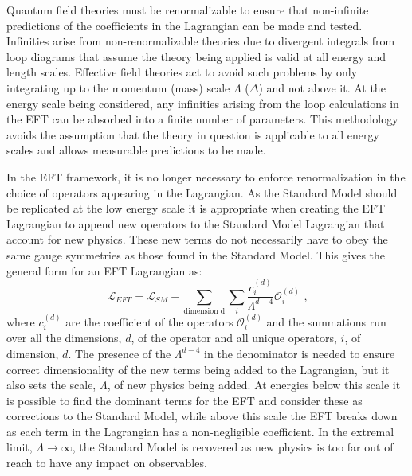 Quantum field theories must be renormalizable to ensure that non-infinite predictions of the coefficients in the Lagrangian can be made and tested.  Infinities arise from non-renormalizable theories due to divergent integrals from loop diagrams that assume the theory being applied is valid at all energy and length scales.  Effective field theories act to avoid such problems by only integrating up to the momentum (mass) scale $\Lambda$ ($\Delta$) and not above it.  At the energy scale being considered, any infinities arising from the loop calculations in the EFT can be absorbed into a finite number of parameters.  This methodology avoids the assumption that the theory in question is applicable to all energy scales and allows measurable predictions to be made.  

In the EFT framework, it is no longer necessary to enforce renormalization in the choice of operators appearing in the Lagrangian.  As the Standard Model should be replicated at the low energy scale it is appropriate when creating the EFT Lagrangian to append new operators to the Standard Model Lagrangian that account for new physics.  These new terms do not necessarily have to obey the same gauge symmetries as those found in the Standard Model.  This gives the general form for an EFT Lagrangian as:
%
\begin{equation}
\mathcal{L}_{EFT} = \mathcal{L}_{SM} + \sum_{\text{dimension d}} \sum_{i} \frac{c_{i}^{(d)}}{\Lambda^{d-4}} \mathcal{O}_{i}^{(d)} \text{ ,}
\end{equation}
%
\noindent where $c_{i}^{(d)}$ are the coefficient of the operators $\mathcal{O}_{i}^{(d)}$ and the summations run over all the dimensions, $d$, of the operator and all unique operators, $i$, of dimension, $d$.  The presence of the $\Lambda^{d-4}$ in the denominator is needed to ensure correct dimensionality of the new terms being added to the Lagrangian, but it also sets the scale, $\Lambda$, of new physics being added.  At energies below this scale it is possible to find the dominant terms for the EFT and consider these as corrections to the Standard Model, while above this scale the EFT breaks down as each term in the Lagrangian has a non-negligible coefficient.  In the extremal limit, $\Lambda \rightarrow \infty$, the Standard Model is recovered as new physics is too far out of reach to have any impact on observables.


